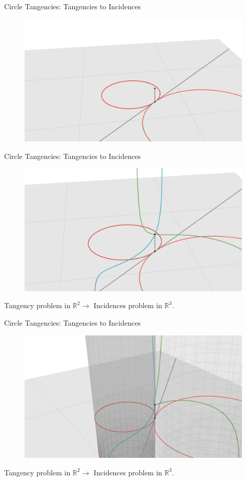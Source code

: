 \documentclass{beamer}
\newcommand{\RR}{\mathbb R}
\newcommand{\nfr}[1]{\begin{frame} #1
\end{frame}}
\begin{document}
\nfr{{Circle Tangencies: Tangencies to Incidences}

\begin{figure}[h]
    \centering
    \includegraphics[width=0.8
    \textwidth, trim={5cm 0 4cm 2cm}, clip=true]{images/Diagram4a.png}
\end{figure}


}

\nfr{{Circle Tangencies: Tangencies to Incidences}

\begin{figure}[h]
    \centering
    \includegraphics[width=0.8
    \textwidth, trim={5cm 0 4cm 2cm}, clip=true]{images/Diagram4b.png}
\end{figure}

Tangency problem in $\RR^2 \to $ Incidences problem in $\RR^3$.
}

\nfr{{Circle Tangencies: Tangencies to Incidences}

\begin{figure}[h]
    \centering
    \includegraphics[width=0.8
    \textwidth, trim={5cm 0 4cm 2cm}, clip=true]{images/Diagram4c.png}
\end{figure}



Tangency problem in $\RR^2 \to $ Incidences problem in $\RR^3$.
}
\end{document}

